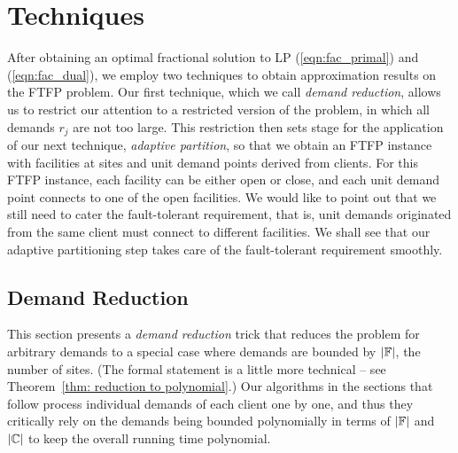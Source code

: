 \documentclass[oneside,final]{ucr}
\begin{document}
\chapter{Techniques} \label{ch: techniques} 

After obtaining an optimal fractional solution to LP
(\ref{eqn:fac_primal}) and (\ref{eqn:fac_dual}), we employ
two techniques to obtain approximation results on the FTFP
problem. Our first technique, which we call \emph{demand
  reduction}, allows us to restrict our attention to a
restricted version of the {\FTFP} problem, in which all
demands $r_j$ are not too large. This restriction then sets
stage for the application of our next technique,
\emph{adaptive partition}, so that we obtain an FTFP
instance with facilities at sites and unit demand points
derived from clients. For this FTFP instance, each facility
can be either open or close, and each unit demand point
connects to one of the open facilities. We would like to
point out that we still need to cater the fault-tolerant
requirement, that is, unit demands originated from the same
client must connect to different facilities. We shall see
that our adaptive partitioning step takes care of the
fault-tolerant requirement smoothly.

\section{Demand Reduction}
\label{sec: polynomial demands}

This section presents a \emph{demand reduction} trick that
reduces the problem for arbitrary demands to a special case
where demands are bounded by $|\mathbb{F}|$, the number of
sites.  (The formal statement is a little more technical --
see Theorem~\ref{thm: reduction to polynomial}.)  Our
algorithms in the sections that follow process individual
demands of each client one by one, and thus they critically
rely on the demands being bounded polynomially in terms of
$|\mathbb{F}|$ and $|\mathbb{C}|$ to keep the overall running time polynomial.
\end{document}

